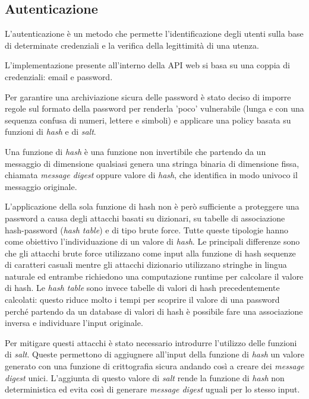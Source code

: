 \subsection{Autenticazione}
L'autenticazione è un metodo che permette l'identificazione degli utenti sulla base di determinate credenziali e la
verifica della legittimità di una utenza.

L'implementazione presente all'interno della API web si basa su una coppia di credenziali: email e password.

Per garantire una archiviazione sicura delle password è stato deciso di imporre regole sul formato della password per renderla 'poco' vulnerabile (lunga e con una sequenza confusa di numeri, lettere e simboli)
e applicare una policy basata su funzioni di \textit{hash} e di \textit{salt}.

Una funzione di \textit{hash} è una funzione non invertibile che partendo da un messaggio di dimensione qualsiasi genera una stringa
binaria di dimensione fissa, chiamata \textit{message digest} oppure valore di \textit{hash}, che identifica in modo univoco il messaggio originale.

L'applicazione della sola funzione di hash non è però sufficiente a proteggere una password a causa degli attacchi basati su dizionari, su tabelle di associazione
hash-password (\textit{hash table}) e di tipo brute force. Tutte queste tipologie hanno come obiettivo l'individuazione di un valore di \textit{hash}.
Le principali differenze sono che gli attacchi brute force utilizzano come input alla funzione di hash sequenze di caratteri casuali mentre gli attacchi dizionario utilizzano
stringhe in lingua naturale ed entrambe richiedono una computazione runtime per calcolare il valore di hash.
Le \textit{hash table} sono invece tabelle di valori di hash precedentemente calcolati: questo riduce molto i tempi per scoprire il valore di una password
perché partendo da un database di valori di hash è possibile fare una associazione inversa e individuare l'input originale.

Per mitigare questi attacchi è stato necessario introdurre l'utilizzo delle funzioni di \textit{salt}.
Queste permettono di aggiugnere all'input della funzione di \textit{hash} un valore generato con una funzione di crittografia sicura andando così a creare dei \textit{message digest} unici.
L'aggiunta di questo valore di \textit{salt} rende la funzione di \textit{hash} non deterministica ed
evita così di generare \textit{message digest} uguali per lo stesso input.


